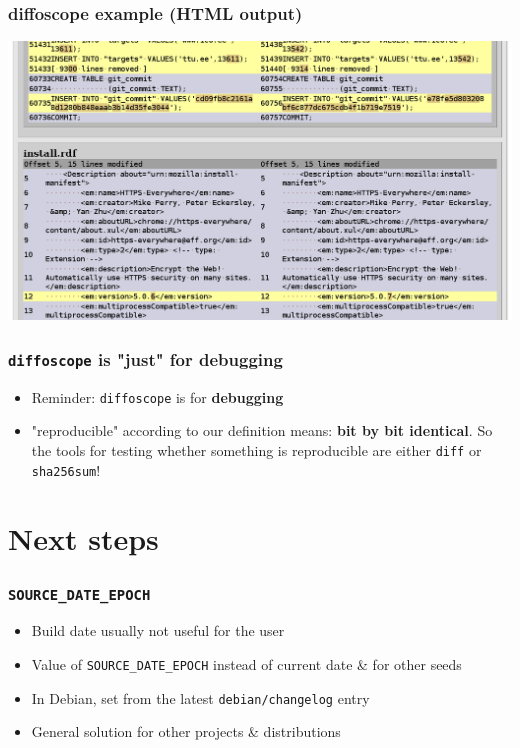 \documentclass[14pt]{beamer}
\begin{document}
\begin{frame}
 \frametitle{diffoscope example (HTML output)}

 \begin{center}
  \includegraphics[width=0.9\paperwidth]{images/diffoscope_example_html.png}
 \end{center}
\end{frame}

\begin{frame}
 \frametitle{\texttt{diffoscope} is "just" for debugging}

 \begin{itemize}
  \item Reminder: \texttt{diffoscope} is for \textbf{debugging}
  \item<2> "reproducible" according to our definition means: \textbf{bit by bit
  identical}. So the tools for testing whether something is reproducible are
  either \texttt{diff} or \texttt{sha256sum}!
 \end{itemize}
\end{frame}

\section{Next steps}

\begin{frame}
 \frametitle{\texttt{SOURCE\_DATE\_EPOCH}}

 \begin{itemize}
  \item Build date usually not useful for the user
  \item Value of \texttt{SOURCE\_DATE\_EPOCH} instead of current date \& for other seeds
  \item In Debian, set from the latest \texttt{debian/changelog} entry
  \item General solution for other projects \& distributions
 \end{itemize}
\end{frame}
\end{document}
